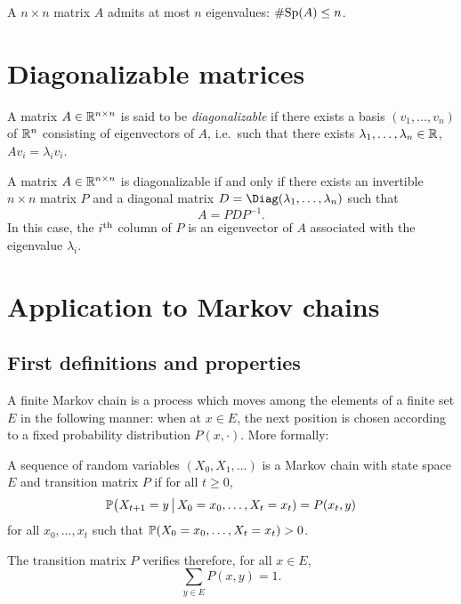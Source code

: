 \documentclass[11pt,nocut]{article}
\begin{document}
\begin{proposition}
	A $n \times n$ matrix $A$ admits at most $n$ eigenvalues: $\# \Sp(A) \leq n$.
\end{proposition}

\section{Diagonalizable matrices}

\begin{definition}
	A matrix $A \in \R^{n \times n}$ is said to be \emph{diagonalizable} if there exists a basis $(v_1, \dots, v_n)$ of $\R^n$ consisting of eigenvectors of $A$, i.e.\ such that there exists $\lambda_1, \dots, \lambda_n \in \R$, $Av_i = \lambda_i v_i$.
\end{definition}

\begin{proposition}
	A matrix $A \in \R^{n \times n}$ is diagonalizable if and only if there exists an invertible $n \times n$ matrix $P$ and a diagonal matrix $D = \Diag(\lambda_1, \dots, \lambda_n)$ such that
	$$
	A = P D P^{-1}.
	$$
	In this case, the $i^{\rm th}$ column of $P$ is an eigenvector of $A$ associated with the eigenvalue $\lambda_i$.
\end{proposition}

\section{Application to Markov chains}

\subsection{First definitions and properties}

A finite Markov chain is a process which moves among the elements of a finite set $E$ in the following manner: when at $x \in E$, the next position is chosen according to a fixed probability distribution $P(x, \cdot)$. More formally:

\begin{definition}
	A sequence of random variables $(X_0, X_1, \dots)$ is a Markov chain with state space $E$ and transition matrix $P$ if for all $t \geq 0$, 
	$$
	\P\big( X_{t+1} = y \, \big| \, X_0= x_0, \dots, X_t = x_t ) = P(x_t,y)
	$$
	for all $x_0, \dots, x_t$ such that $\P(X_0 = x_0, \dots, X_t = x_t) >0$.
\end{definition}

The transition matrix $P$ verifies therefore, for all $x \in E$,
\begin{equation}
	\sum_{y \in E} P(x,y) = 1.
\end{equation}
\end{document}
